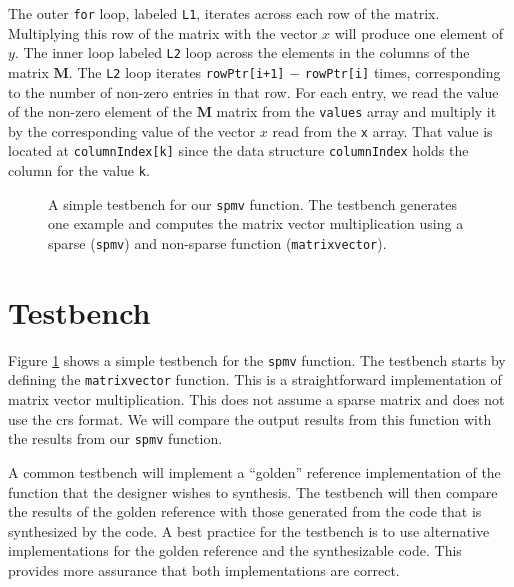 The outer \lstinline{for} loop, labeled \lstinline{L1}, iterates across each row of the matrix. Multiplying this row of the matrix with the vector $x$ will produce one element of $y$.  The inner loop labeled \lstinline{L2} loop across the elements in the columns of the matrix $\mathbf{M}$. The \lstinline{L2} loop iterates \lstinline{rowPtr[i+1]} $-$ \lstinline{rowPtr[i]} times, corresponding to the number of non-zero entries in that row. For each entry, we read the value of the non-zero element of the $\mathbf{M}$ matrix from the \lstinline{values} array and multiply it by the corresponding value of the vector $x$ read from the \lstinline{x} array. That value is located at \lstinline{columnIndex[k]} since the data structure \lstinline{columnIndex} holds the column for the value \lstinline{k}. 

\begin{figure}
\begin{scriptsize}

\end{scriptsize}
\caption{  A simple testbench for our \lstinline{spmv} function. The testbench generates one example and computes the matrix vector multiplication using a sparse (\lstinline{spmv}) and non-sparse function (\lstinline{matrixvector}).}
\label{fig:spmv_test}
\end{figure}

\section{Testbench}

Figure \ref{fig:spmv_test} shows a simple testbench for the \lstinline{spmv} function. The testbench starts by defining the \lstinline{matrixvector} function. This is a straightforward implementation of matrix vector multiplication. This does not assume a sparse matrix and does not use the \gls{crs} format. We will compare the output results from this function with the results from our \lstinline{spmv} function. 

\begin{aside}
A common testbench will implement a ``golden'' reference implementation of the function that the designer wishes to synthesis. The testbench will then compare the results of the golden reference with those generated from the code that is synthesized by the \VHLS code. A best practice for the testbench is to use alternative implementations for the golden reference and the synthesizable code. This provides more assurance that both implementations are correct. 
\end{aside}

